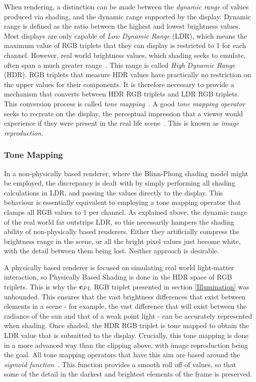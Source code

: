 When rendering, a distinction can be made between the \textit{dynamic range} of values produced via shading, and the dynamic range supported by the display. Dynamic range is defined as the ratio between the highest and lowest brightness values. Most displays are only capable of \textit{Low Dynamic Range} (LDR), which means the maximum value of RGB triplets that they can display is restricted to 1 for each channel. However, real world brightness values, which shading seeks to emulate, often span a much greater range~\cite{Reinhard}. This range is called \textit{High Dynamic Range} (HDR). RGB triplets that measure HDR values have practically no restriction on the upper values for their components. It is therefore necessary to provide a mechanism that converts between HDR RGB triplets and LDR RGB triplets. This conversion process is called \textit{tone mapping}~\cite{HoffmanKeynoteEchoChamber}. A good \textit{tone mapping operator} seeks to recreate on the display, the perceptual impression that a viewer would experience if they were present in the real life scene~\cite{HoffmanKeynoteEchoChamber}. This is known as \textit{image reproduction}.

\subsubsection{Tone Mapping}

In a non-physically based renderer, where the Blinn-Phong shading model might be employed, the discrepancy is dealt with by simply performing all shading calculations in LDR, and passing the values directly to the display. This behaviour is essentially equivalent to employing a tone mapping operator that clamps all RGB values to 1 per channel. As explained above, the dynamic range of the real world far outstrips LDR, so this necessarily hampers the shading ability of non-physically based renderers. Either they artificially compress the brightness range in the scene, or all the bright pixel values just become white, with the detail between them being lost. Neither approach is desirable.

A physically based renderer is focused on simulating real world light-matter interaction, so Physically Based Shading is done in the HDR space of RGB triplets. This is why the \begin{math}\mathbf{c}_{PL}\end{math} RGB triplet presented in section \ref{Illumination} was unbounded. This ensures that the vast brightness differences that exist between elements in a scene - for example, the vast difference that will exist between the radiance of the sun and that of a weak point light - can be accurately represented when shading. Once shaded, the HDR RGB triplet is tone mapped to obtain the LDR value that is submitted to the display. Crucially, this tone mapping is done in a more advanced way than the clipping above, with image reproduction being the goal. All tone mapping operators that have this aim are based around the \textit{sigmoid function}~\cite{HoffmanKeynoteEchoChamber}. This function provides a smooth roll off of values, so that some of the detail in the darkest and brightest elements of the frame is preserved.


